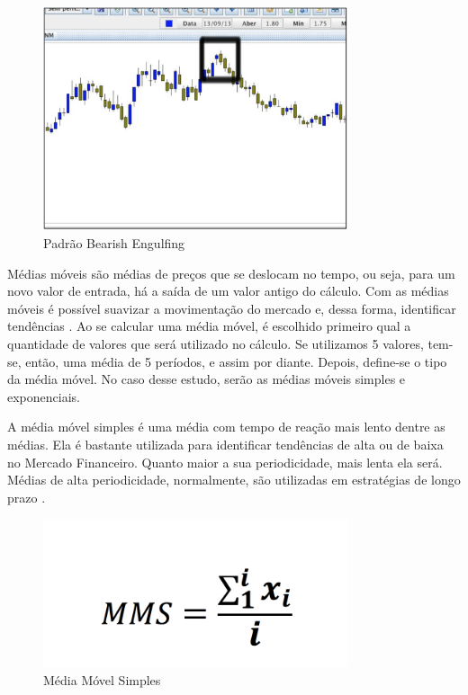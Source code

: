 \begin{figure}[h]
\centering
\label{f21}
\includegraphics[width=0.8\textwidth]{figuras/f21}
\caption{Padrão Bearish Engulfing}
\end{figure}


Médias móveis são médias de preços que se deslocam no tempo, ou seja, para um novo valor de entrada, há a saída de um valor antigo do cálculo. Com as médias móveis é possível suavizar a movimentação do mercado e, dessa forma, identificar tendências \cite[p.68]{matsura2006}. Ao se calcular uma média móvel, é escolhido primeiro qual a quantidade de valores que será utilizado no cálculo. Se utilizamos 5 valores, tem-se, então, uma média de 5 períodos, e assim por diante. Depois, define-se o tipo da média móvel. No caso desse estudo, serão as médias móveis simples e exponenciais.

A média móvel simples é uma média com tempo de reação mais lento dentre as médias. Ela é bastante utilizada para identificar tendências de alta ou de baixa no Mercado Financeiro. Quanto maior a sua periodicidade, mais lenta ela será. Médias de alta periodicidade, normalmente, são utilizadas em estratégias de longo prazo \cite[p. 69]{matsura2006}.

\begin{figure}[h]
\centering
\label{f22}
\includegraphics[width=0.8\textwidth]{figuras/f22}
\caption{Média Móvel Simples}
\end{figure}


